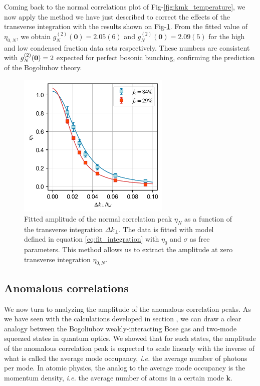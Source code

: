 Coming back to the normal correlations plot of Fig-\ref{fig:kmk_temperature}, we now apply the method we have just described to correct the effects of the transverse integration with the results shown on Fig-\ref{fig:integration_kk}. From the fitted value of $\eta_{0,N}$, we obtain $g^{(2)}_N(\bm{0})=2.05(6)$ and $g^{(2)}_N(\bm{0})=2.09(5)$ for the high and low condensed fraction data sets respectively. These numbers are consistent with $g^{(2)}_N (\bm{0})=2$ expected for perfect bosonic bunching, confirming the prediction of the Bogoliubov theory. 

\begin{figure}
    \centering
    \includegraphics[width=0.65\textwidth]{Fig/Chapter4/eta_vs_int_kk.png}
    \caption{Fitted amplitude of the normal correlation peak $\eta_N$ as a function of the transverse integration $\Delta k_{\perp}$. The data is fitted with model defined in equation \ref{eq:fit_integration} with $\eta_0$ and $\sigma$ as free parameters. This method allows us to extract the amplitude at zero transverse integration $\eta_{0,N}$.}
    \label{fig:integration_kk}
\end{figure}

\subsection{Anomalous correlations}

We now turn to analyzing the amplitude of the anomalous correlation peaks. As we have seen with the calculations developed in section , we can draw a clear analogy between the Bogoliubov weakly-interacting Bose gas and two-mode squeezed states in quantum optics. We showed that for such states, the amplitude of the anomalous correlation peak is expected to scale linearly with the inverse of what is called the average mode occupancy, {\it i.e.} the average number of photons per mode. In atomic physics, the analog to the average mode occupancy is the momentum density, {\it i.e.} the average number of atoms in a certain mode $\bm{k}$.

